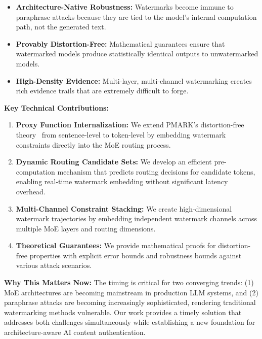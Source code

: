 \documentclass[letterpaper,twocolumn,10pt]{article}
\begin{document}
\begin{itemize}
\item \textbf{Architecture-Native Robustness:} Watermarks become immune to paraphrase attacks because they are tied to the model's internal computation path, not the generated text.
\item \textbf{Provably Distortion-Free:} Mathematical guarantees ensure that watermarked models produce statistically identical outputs to unwatermarked models.
\item \textbf{High-Density Evidence:} Multi-layer, multi-channel watermarking creates rich evidence trails that are extremely difficult to forge.
\end{itemize}

\textbf{Key Technical Contributions:}

\begin{enumerate}
\item \textbf{Proxy Function Internalization:} We extend PMARK's distortion-free theory~\cite{pmark2024} from sentence-level to token-level by embedding watermark constraints directly into the MoE routing process.

\item \textbf{Dynamic Routing Candidate Sets:} We develop an efficient pre-computation mechanism that predicts routing decisions for candidate tokens, enabling real-time watermark embedding without significant latency overhead.

\item \textbf{Multi-Channel Constraint Stacking:} We create high-dimensional watermark trajectories by embedding independent watermark channels across multiple MoE layers and routing dimensions.

\item \textbf{Theoretical Guarantees:} We provide mathematical proofs for distortion-free properties with explicit error bounds and robustness bounds against various attack scenarios.
\end{enumerate}

\textbf{Why This Matters Now:} The timing is critical for two converging trends: (1) MoE architectures are becoming mainstream in production LLM systems, and (2) paraphrase attacks are becoming increasingly sophisticated, rendering traditional watermarking methods vulnerable. Our work provides a timely solution that addresses both challenges simultaneously while establishing a new foundation for architecture-aware AI content authentication.

\end{document}
